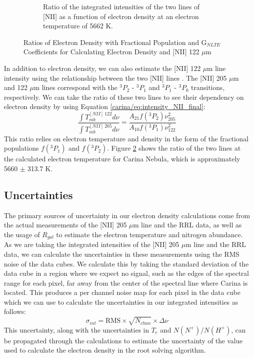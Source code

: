 \begin{figure}
\begin{subfigure}[t]{0.45\textwidth}
        \caption{Ratio of the integrated intensities of the two lines of [NII] as a function of electron density at an electron temperature of 5662 K.}
        \label{carina/fig:nii_curves}
    \end{subfigure}
    \caption{Ratios of Electron Density with Fractional Population and G$_{NLTE}$ Coefficients for Calculating Electron Density and [NII] 122 $\mu$m}
\end{figure}

In addition to electron density, we can also estimate the [NII] 122 $\mu$m line intensity using the relationship between the two [NII] lines \parencite{goldsmith2015herschel}.
The [NII] 205 $\mu$m and 122 $\mu$m lines correspond with the $^3P_2$ - $^3P_1$ and $^3P_1$ - $^3P_0$ transitions, respectively. 
We can take the ratio of these two lines to see their dependency on electron density by using Equation \ref{carina/eq:intensity_NII_final}:
\begin{equation}
    \frac{\int{T_{mb}^{[NII]\ 122}} d\nu}{\int{T_{mb}^{[NII]\ 205}} d\nu} = \frac{A_{21}f(^3P_2)\nu^2_{205}}{A_{10}f(^3P_1)\nu_{122}^2}
    \label{carina/eq:intensity_NII_ratio}
\end{equation}
This ratio relies on electron temperature and density in the form of the fractional populations $f(^3P_1)$ and $f(^3P_2)$.
Figure \ref{carina/fig:nii_curves} shows the ratio of the two lines at the calculated electron temperature for Carina Nebula, which is approximately 5660 $\pm$ 313.7 K.


\subsection{Uncertainties}
The primary sources of uncertainty in our electron density calculations come from the actual measurements of the [NII] 205 $\mu$m line and the RRL data, as well as the usage of $R_{gal}$ to estimate the electron temperature and nitrogen abundance.
As we are taking the integrated intensities of the [NII] 205 $\mu$m line and the RRL data, we can calculate the uncertainties in these measurements using the RMS noise of the data cubes.
We calculate this by taking the standard deviation of the data cube in a region where we expect no signal, such as the edges of the spectral range for each pixel, far away from the center of the spectral line where Carina is located. 
This produces a per channel noise map for each pixel in the data cube which we can use to calculate the uncertainties in our integrated intensities as follows:
\begin{equation}
    \sigma_{int} = \text{RMS} \times \sqrt{N_{chan}} \times \Delta \nu
    \label{carina/eq:uncertainty_intensity}
\end{equation}
This uncertainty, along with the uncertainties in $T_e$ and $N(N^+)/N(H^+)$, can be propagated through the calculations to estimate the uncertainty of the value used to calculate the electron density in the root solving algorithm.

